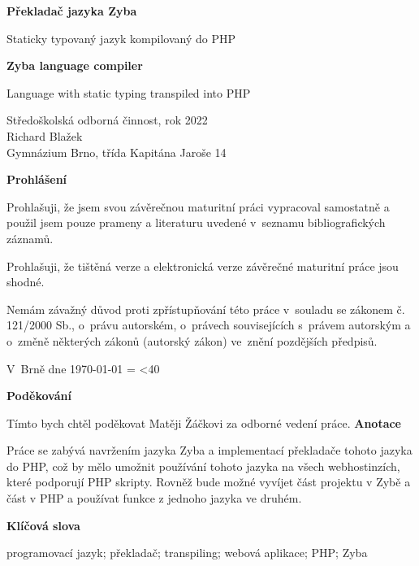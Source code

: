 \documentclass[a4paper,12pt]{article}
\author{Richard Blažek}
\makeatletter
\newcommand{\repeatchar}[2]{%
  \begingroup
  \my@repeat@count=\z@
  \@whilenum\my@repeat@count<#1\do{#2\advance\my@repeat@count\@ne}%
  \endgroup
}
\makeatother
\begin{document}
\begin{titlepage}
    \begin{center}

	\vspace*{3.5cm}            
	\Huge
	\textbf{Překladač jazyka Zyba}
            
	\vspace{0.5cm}
	\LARGE
	Staticky typovaný jazyk kompilovaný do PHP
        
	\vspace*{1.5cm}
	\Huge
	\textbf{Zyba language compiler}
            
	\vspace{0.5cm}
	\LARGE
	Language with static typing transpiled into PHP
            
	\vfill
            
	\large
        Středoškolská odborná činnost, rok 2022\\
	Richard Blažek\\
	Gymnázium Brno, třída Kapitána Jaroše 14
    \end{center}
\end{titlepage}
\thispagestyle{empty}
\Large\textbf{Prohlášení}\normalsize

Prohlašuji, že jsem svou závěrečnou maturitní práci vypracoval samostatně a použil jsem pouze prameny a literaturu uvedené v~seznamu bibliografických záznamů.

Prohlašuji, že tištěná verze a elektronická verze závěrečné maturitní práce jsou shodné.

Nemám závažný důvod proti zpřístupňování této práce v~souladu se zákonem č. 121/2000 Sb., o~právu autorském, o~právech souvisejících s~právem autorským a o~změně některých zákonů (autorský zákon) ve~znění pozdějších předpisů. 

V~Brně dne \today{} \repeatchar{40}{.}
\newpage
\thispagestyle{empty}
\Large\textbf{Poděkování}\normalsize

Tímto bych chtěl poděkovat Matěji Žáčkovi za odborné vedení práce.
\newpage
\thispagestyle{empty}
\Large\textbf{Anotace}\normalsize

Práce se zabývá navržením jazyka Zyba a implementací překladače tohoto jazyka do PHP, což by mělo umožnit používání tohoto jazyka na všech webhostinzích, které podporují PHP skripty. Rovněž bude možné vyvíjet část projektu v Zybě a část v PHP a používat funkce z jednoho jazyka ve druhém.

\Large\textbf{Klíčová slova}\normalsize

programovací jazyk; překladač; transpiling; webová aplikace; PHP; Zyba
\end{document}
